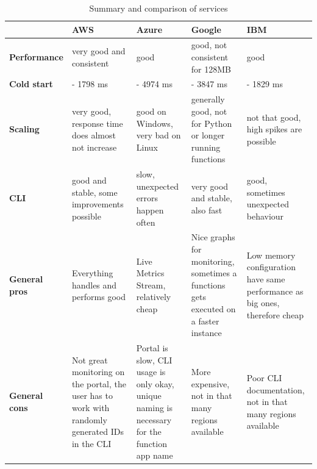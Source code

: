 \begin{table}[h]
\begin{tabularx}{\textwidth}{ |l| *4{>{\Centering}X|}}
\cline{1-5}
	&	\textbf{AWS}	&	\textbf{Azure}	&	\textbf{Google}	&	\textbf{IBM} \\ \hline
\textbf{Performance} & very good and \newline consistent & good & good, not consistent for 128MB & good \\ \hline
\textbf{Cold start} & 223 - 1798 ms & 1256 - 4974 ms & 1178 - 3847 ms &  599 - 1829 ms\\ \hline
\textbf{Scaling} & very good, \newline response time does almost not increase & good on Windows, \newline very bad on Linux & generally good, \newline not for Python or longer running functions & not that good, \newline high spikes are possible \\ \hline
\textbf{CLI} & good and stable, \newline some improvements possible & slow, unexpected errors happen often & very good and stable, also fast & good, sometimes unexpected behaviour\\ \hline
\textbf{General pros} & Everything handles and performs good & Live Metrics Stream, relatively cheap & Nice graphs for monitoring, sometimes a functions gets executed on a faster instance & Low memory configuration have same performance as big ones, therefore cheap \\ \hline
\textbf{General cons} & Not great monitoring on the portal, the user has to work with randomly generated IDs in the CLI & Portal is slow, CLI usage is only okay, unique naming is necessary for the function app name & More expensive, not in that many regions available & Poor CLI documentation, not in that many regions available \\ \hline
\end{tabularx}
\caption[Summary and comparison of services]{Summary and comparison of services}
    \label{tab:summary}
\end{table}

